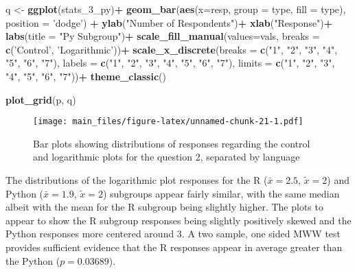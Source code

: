 \documentclass[
]{article}
\newenvironment{Shaded}{\begin{snugshade}}{\end{snugshade}}
\newcommand{\DataTypeTok}[1]{\textcolor[rgb]{0.13,0.29,0.53}{#1}}
\newcommand{\DecValTok}[1]{\textcolor[rgb]{0.00,0.00,0.81}{#1}}
\newcommand{\KeywordTok}[1]{\textcolor[rgb]{0.13,0.29,0.53}{\textbf{#1}}}
\newcommand{\NormalTok}[1]{#1}
\newcommand{\OperatorTok}[1]{\textcolor[rgb]{0.81,0.36,0.00}{\textbf{#1}}}
\newcommand{\StringTok}[1]{\textcolor[rgb]{0.31,0.60,0.02}{#1}}
\begin{document}
\begin{Shaded}
\begin{Highlighting}[]
\NormalTok{q <-}\StringTok{ }\KeywordTok{ggplot}\NormalTok{(stats_}\DecValTok{3}\NormalTok{_py)}\OperatorTok{+}
\StringTok{  }\KeywordTok{geom_bar}\NormalTok{(}\KeywordTok{aes}\NormalTok{(}\DataTypeTok{x=}\NormalTok{resp, }\DataTypeTok{group =}\NormalTok{ type, }\DataTypeTok{fill =}\NormalTok{ type), }\DataTypeTok{position =} \StringTok{'dodge'}\NormalTok{) }\OperatorTok{+}
\StringTok{  }\KeywordTok{ylab}\NormalTok{(}\StringTok{"Number of Respondents"}\NormalTok{)}\OperatorTok{+}
\StringTok{  }\KeywordTok{xlab}\NormalTok{(}\StringTok{"Response"}\NormalTok{)}\OperatorTok{+}
\StringTok{  }\KeywordTok{labs}\NormalTok{(}\DataTypeTok{title =} \StringTok{"Py Subgroup"}\NormalTok{)}\OperatorTok{+}
\StringTok{  }\KeywordTok{scale_fill_manual}\NormalTok{(}\DataTypeTok{values=}\NormalTok{vals, }\DataTypeTok{breaks =} \KeywordTok{c}\NormalTok{(}\StringTok{'Control'}\NormalTok{, }\StringTok{'Logarithmic'}\NormalTok{))}\OperatorTok{+}
\StringTok{  }\KeywordTok{scale_x_discrete}\NormalTok{(}\DataTypeTok{breaks =} \KeywordTok{c}\NormalTok{(}\StringTok{"1"}\NormalTok{, }\StringTok{"2"}\NormalTok{, }\StringTok{"3"}\NormalTok{, }\StringTok{"4"}\NormalTok{, }\StringTok{"5"}\NormalTok{, }\StringTok{"6"}\NormalTok{, }\StringTok{"7"}\NormalTok{), }\DataTypeTok{labels =} \KeywordTok{c}\NormalTok{(}\StringTok{"1"}\NormalTok{, }\StringTok{"2"}\NormalTok{, }\StringTok{"3"}\NormalTok{, }\StringTok{"4"}\NormalTok{, }\StringTok{"5"}\NormalTok{, }\StringTok{"6"}\NormalTok{, }\StringTok{"7"}\NormalTok{), }\DataTypeTok{limits =} \KeywordTok{c}\NormalTok{(}\StringTok{"1"}\NormalTok{, }\StringTok{"2"}\NormalTok{, }\StringTok{"3"}\NormalTok{, }\StringTok{"4"}\NormalTok{, }\StringTok{"5"}\NormalTok{, }\StringTok{"6"}\NormalTok{, }\StringTok{"7"}\NormalTok{))}\OperatorTok{+}
\StringTok{  }\KeywordTok{theme_classic}\NormalTok{()}

\KeywordTok{plot_grid}\NormalTok{(p, q)}
\end{Highlighting}
\end{Shaded}

\begin{figure}
\centering
\texttt{[image: main\_files/figure-latex/unnamed-chunk-21-1.pdf]}
\caption{Bar plots showing distributions of responses regarding the
control and logarithmic plots for the question 2, separated by language}
\end{figure}

The distributions of the logarithmic plot responses for the R
(\(\bar{x}=2.5\), \(\tilde{x}=2\)) and Python (\(\bar{x}=1.9\),
\(\tilde{x}=2\)) subgroups appear fairly similar, with the same median
albeit with the mean for the R subgroup being slightly higher. The plots
to appear to show the R subgroup responses being slightly positively
skewed and the Python responses more centered around 3. A two sample,
one sided MWW test provides sufficient evidence that the R responses
appear in average greater than the Python (\(p=0.03689\)).
\end{document}
